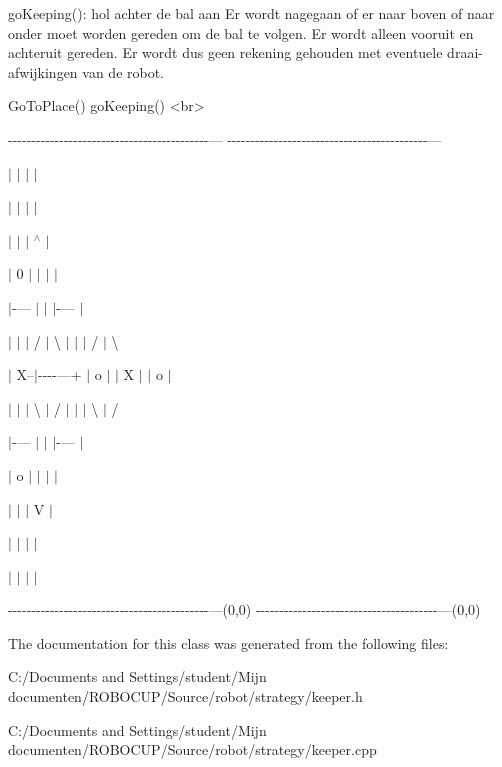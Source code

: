 \begin{DoxyItemize}
\begin{DoxyItemize}
\item go\-Keeping()\-: hol achter de bal aan Er wordt nagegaan of er naar boven of naar onder moet worden gereden om de bal te volgen. Er wordt alleen vooruit en achteruit gereden. Er wordt dus geen rekening gehouden met eventuele draai-\/afwijkingen van de robot. \begin{DoxyVerb}    GoToPlace()                                                 goKeeping()                       <br>
\end{DoxyVerb}
 -\/-\/-\/-\/-\/-\/-\/-\/-\/-\/-\/-\/-\/-\/-\/-\/-\/-\/-\/-\/-\/-\/-\/-\/-\/-\/-\/-\/-\/-\/-\/-\/-\/-\/-\/-\/-\/-\/-\/-\/-\/-\/-\/--- -\/-\/-\/-\/-\/-\/-\/-\/-\/-\/-\/-\/-\/-\/-\/-\/-\/-\/-\/-\/-\/-\/-\/-\/-\/-\/-\/-\/-\/-\/-\/-\/-\/-\/-\/-\/-\/-\/-\/-\/-\/-\/-\/--- \par
 $|$ $|$ $|$ $|$ \par
 $|$ $|$ $|$ $|$ \par
 $|$ $|$ $|$ $^\wedge$ $|$ \par
 $|$ 0 $|$ $|$ $|$ $|$ \par
 $|$-\/--- $|$ $|$ $|$-\/--- $|$ \par
 $|$ $|$ $|$ / $|$ \textbackslash{} $|$ $|$ $|$ / $|$ \textbackslash{} \par
 $|$ X--$|$-\/-\/-\/-\/---+ $|$ o $|$ $|$ X $|$ $|$ o $|$ \par
 $|$ $|$ $|$ \textbackslash{} $|$ / $|$ $|$ $|$ \textbackslash{} $|$ / \par
 $|$-\/--- $|$ $|$ $|$-\/--- $|$ \par
 $|$ o $|$ $|$ $|$ $|$ \par
 $|$ $|$ $|$ V $|$ \par
 $|$ $|$ $|$ $|$ \par
 $|$ $|$ $|$ $|$ \par
 -\/-\/-\/-\/-\/-\/-\/-\/-\/-\/-\/-\/-\/-\/-\/-\/-\/-\/-\/-\/-\/-\/-\/-\/-\/-\/-\/-\/-\/-\/-\/-\/-\/-\/-\/-\/-\/-\/-\/-\/-\/-\/-\/---(0,0) -\/-\/-\/-\/-\/-\/-\/-\/-\/-\/-\/-\/-\/-\/-\/-\/-\/-\/-\/-\/-\/-\/-\/-\/-\/-\/-\/-\/-\/-\/-\/-\/-\/-\/-\/-\/-\/-\/-\/---(0,0) \par
 
\end{DoxyItemize}
\end{DoxyItemize}

The documentation for this class was generated from the following files\-:\begin{DoxyCompactItemize}
\item 
C\-:/\-Documents and Settings/student/\-Mijn documenten/\-R\-O\-B\-O\-C\-U\-P/\-Source/robot/strategy/keeper.\-h\item 
C\-:/\-Documents and Settings/student/\-Mijn documenten/\-R\-O\-B\-O\-C\-U\-P/\-Source/robot/strategy/keeper.\-cpp\end{DoxyCompactItemize}
